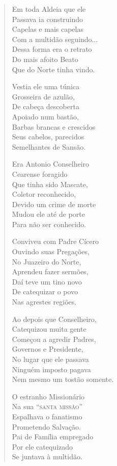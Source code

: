 \begin{verse}
Em toda Aldeia que ele \\
Passava ia construindo \\
Capelas e mais capelas \\
Com a multidão seguindo... \\
Dessa forma era o retrato \\
Do mais afoito Beato \\
Que do Norte tinha vindo. 


Vestia ele uma túnica \\
Grosseira de azulão, \\
De cabeça descoberta \\
Apoiado num bastão, \\
Barbas brancas e crescidos \\
Seus cabelos, parecidos \\
Semelhantes de Sansão. 

Era Antonio Conselheiro \\
Cearense foragido \\
Que tinha sido Mascate, \\
Coletor reconhecido, \\
Devido um crime de morte \\
Mudou ele até de porte \\
Para não ser conhecido. 

Conviveu com Padre Cícero \\
Ouvindo suas Pregações, \\
No Juazeiro do Norte, \\
Aprendeu fazer sermões, \\
Daí teve um tino novo \\
De catequizar o povo \\
Nas agrestes regiões. 

Ao depois que Conselheiro, \\
Catequizou muita gente \\
Começou a agredir Padres, \\
Governos e Presidente, \\
No lugar que ele passava \\
Ninguém imposto pagava \\
Nem mesmo um tostão somente. 


O estranho Missionário \\
Na sua ``\textsc{santa missão}'' \\
Espalhava o fanatismo \\
Prometendo Salvação. \\
Pai de Família empregado \\
Por ele catequizado \\
Se juntava à multidão. 


\end{verse}
